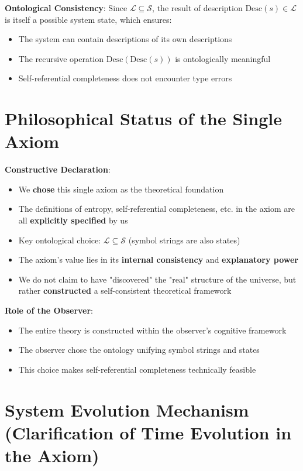 \textbf{Ontological Consistency}: Since $\mathcal{L} \subseteq \mathcal{S}$, the result of description $\text{Desc}(s) \in \mathcal{L}$ is itself a possible system state, which ensures:
\begin{itemize}
\item The system can contain descriptions of its own descriptions
\item The recursive operation $\text{Desc}(\text{Desc}(s))$ is ontologically meaningful
\item Self-referential completeness does not encounter type errors
\end{itemize}

\section{Philosophical Status of the Single Axiom}
\label{sec:ch02_axiom:philosophical-status-of-the-single-axiom}

\textbf{Constructive Declaration}:
\begin{itemize}
\item We \textbf{chose} this single axiom as the theoretical foundation
\item The definitions of entropy, self-referential completeness, etc. in the axiom are all \textbf{explicitly specified} by us
\item Key ontological choice: $\mathcal{L} \subseteq \mathcal{S}$ (symbol strings are also states)
\item The axiom's value lies in its \textbf{internal consistency} and \textbf{explanatory power}
\item We do not claim to have "discovered" the "real" structure of the universe, but rather \textbf{constructed} a self-consistent theoretical framework
\end{itemize}

\textbf{Role of the Observer}:
\begin{itemize}
\item The entire theory is constructed within the observer's cognitive framework
\item The observer chose the ontology unifying symbol strings and states
\item This choice makes self-referential completeness technically feasible
\end{itemize}

\section{System Evolution Mechanism (Clarification of Time Evolution in the Axiom)}
\label{sec:ch02_axiom:system-evolution-mechanism-clarification-of-time-evolution-in-the-axiom}

